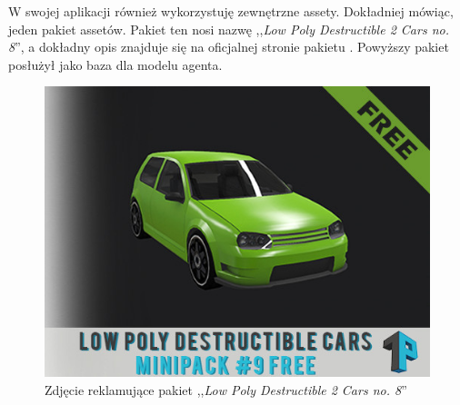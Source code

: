 W swojej aplikacji również wykorzystuję zewnętrzne assety. Dokładniej mówiąc, jeden pakiet assetów. Pakiet ten nosi nazwę ,,\textit{Low Poly Destructible 2 Cars no. 8}'', a dokładny opis znajduje się na oficjalnej stronie pakietu \cite{assets:lowPolyCar}.
Powyższy pakiet posłużył jako baza dla modelu agenta.

\vspace{1.5cm}
\begin{figure}[H]
\centering
\includegraphics[width=15cm]{resources/figures/car_picture.jpg}
\caption{Zdjęcie reklamujące pakiet ,,\textit{Low Poly Destructible 2 Cars no. 8}''}
\label{CarPicture}
\end{figure}

\vspace{1.5cm}
